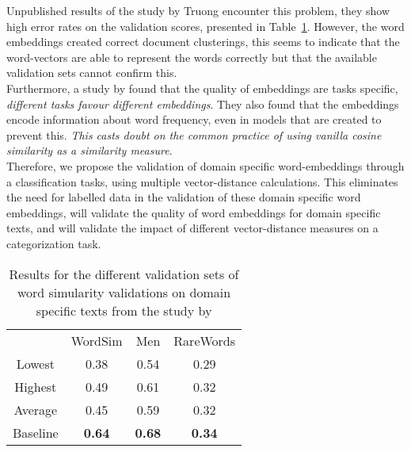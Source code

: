 \documentclass[../../Thesis.tex]{subfiles}
\begin{document}
Unpublished results of the study by Truong encounter this problem, they show high error rates on the validation scores, presented in Table~\ref{table:truongErrorRates}. However, the word embeddings created correct document clusterings\cite{Truong2017Thesis}, this seems to indicate that the word-vectors are able to represent the words correctly but that the available validation sets cannot confirm this.\\
Furthermore, a study by \citet{schnabel2015evaluation} found that the quality of embeddings are tasks specific, \textit{different tasks favour different embeddings}. They also found that the embeddings encode information about word frequency, even in models that are created to prevent this. \textit{This casts doubt on the common practice of using vanilla cosine similarity as a similarity measure}.\\
Therefore, we propose the validation of domain specific word-embeddings through a classification tasks, using multiple vector-distance calculations. This eliminates the need for labelled data in the validation of these domain specific word embeddings, will validate the quality of word embeddings for domain specific texts, and will validate the impact of different vector-distance measures on a categorization task.
\begin{table}
\begin{center}
\begin{tabular}{c c c c}
&WordSim & Men & RareWords\\
Lowest & 0.38 & 0.54 & 0.29 \\
Highest & 0.49 & 0.61 & 0.32\\
Average & 0.45 & 0.59 & 0.32\\
Baseline & \textbf{0.64} & \textbf{0.68} & \textbf{0.34}
\end{tabular}
\end{center}
\caption{Results for the different validation sets of word simularity validations on domain specific texts from the study by \citet{Truong2017Thesis}}\label{table:truongErrorRates}
\end{table}
\end{document}
